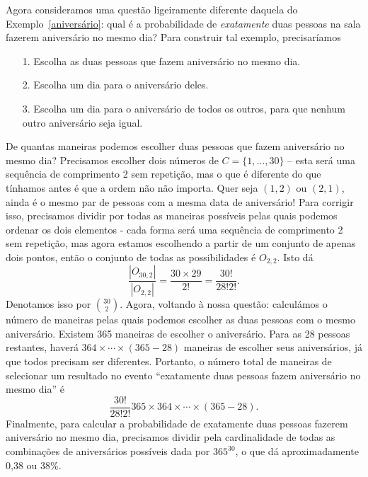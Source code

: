 \begin{exemplo}
\label{aniversário2}
     Agora consideramos uma questão ligeiramente diferente daquela do Exemplo~\ref{aniversário}: qual é a probabilidade de \emph{exatamente} duas pessoas na sala fazerem aniversário no mesmo dia? Para construir tal exemplo, precisaríamos
     \begin{itemize}
         \item[1.] Escolha as duas pessoas que fazem aniversário no mesmo dia.
         \item[2.] Escolha um dia para o aniversário deles.
         \item[3.] Escolha um dia para o aniversário de todos os outros, para que nenhum outro aniversário seja igual.
     \end{itemize}
     De quantas maneiras podemos escolher duas pessoas que fazem aniversário no mesmo dia? Precisamos escolher dois números de $C=\{1,\dots,30\}$ -- esta será uma sequência de comprimento 2 sem repetição, mas o que é diferente do que tínhamos antes é que a ordem não não importa. Quer seja $(1,2)$ ou $(2,1)$, ainda é o mesmo par de pessoas com a mesma data de aniversário! Para corrigir isso, precisamos dividir por todas as maneiras possíveis pelas quais podemos ordenar os dois elementos - cada forma será uma sequência de comprimento 2 sem repetição, mas agora estamos escolhendo a partir de um conjunto de apenas dois pontos, então o conjunto de todas as possibilidades é $O_{2,2}$. Isto dá
     \begin{equation}
         \frac{|O_{30,2}|}{|O_{2,2}|} = \frac{30 \times 29}{2!} = \frac{30!}{28!2!}.
     \end{equation}
     Denotamos isso por $\binom{30}{2}$. Agora, voltando à nossa questão: calculámos o número de maneiras pelas quais podemos escolher as duas pessoas com o mesmo aniversário. Existem 365 maneiras de escolher o aniversário. Para as 28 pessoas restantes, haverá $364\times\cdots\times (365-28)$ maneiras de escolher seus aniversários, já que todos precisam ser diferentes. Portanto, o número total de maneiras de selecionar um resultado no evento “exatamente duas pessoas fazem aniversário no mesmo dia” é
     \[ \frac{30!}{28!2!} 365\times 364 \times\cdots\times (365-28). \]
     Finalmente, para calcular a probabilidade de exatamente duas pessoas fazerem aniversário no mesmo dia, precisamos dividir pela cardinalidade de todas as combinações de aniversários possíveis dada por $365^{30}$, o que dá aproximadamente 0,38 ou 38\%.
\end{exemplo}

